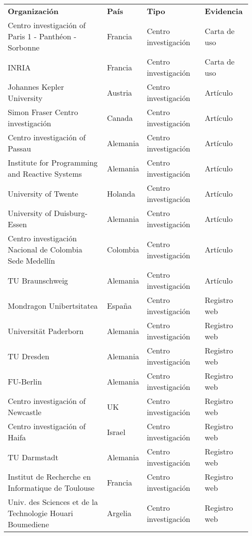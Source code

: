 \begin{table}[htbp]
  \centering
    \begin{tabular}{llll}
    \textbf{Organización}  & \textbf{País} & \textbf{Tipo} & \textbf{Evidencia} \\
    Centro investigación of Paris 1 - Panthéon - Sorbonne & Francia & Centro investigación & Carta de uso \\
    INRIA & Francia & Centro investigación & Carta de uso \\
    Johannes Kepler University & Austria & Centro investigación & Artículo \\
    Simon Fraser Centro investigación & Canada & Centro investigación & Artículo \\
    Centro investigación of Passau & Alemania & Centro investigación & Artículo \\
    Institute for Programming and Reactive Systems & Alemania & Centro investigación & Artículo \\
    University of Twente & Holanda & Centro investigación & Artículo \\
		University of Duisburg-Essen & Alemania & Centro investigación & Artículo \\
		Centro investigación Nacional de Colombia Sede Medellín & Colombia & Centro investigación & Artículo \\
    TU Braunschweig & Alemania & Centro investigación & Artículo \\
    Mondragon Unibertsitatea & España & Centro investigación & Registro web \\
    Universität Paderborn & Alemania & Centro investigación & Registro web \\
    TU Dresden & Alemania & Centro investigación & Registro web \\
    FU-Berlin & Alemania & Centro investigación & Registro web \\
    Centro investigación of Newcastle & UK    & Centro investigación & Registro web \\
    Centro investigación of Haifa & Israel & Centro investigación & Registro web \\
    TU Darmstadt & Alemania & Centro investigación & Registro web \\
    Institut de Recherche en Informatique de Toulouse & Francia & Centro investigación & Registro web \\
    Univ. des Sciences et de la Technologie Houari Boumediene & Argelia & Centro investigación & Registro web \\

\end{tabular}
\end{table}
